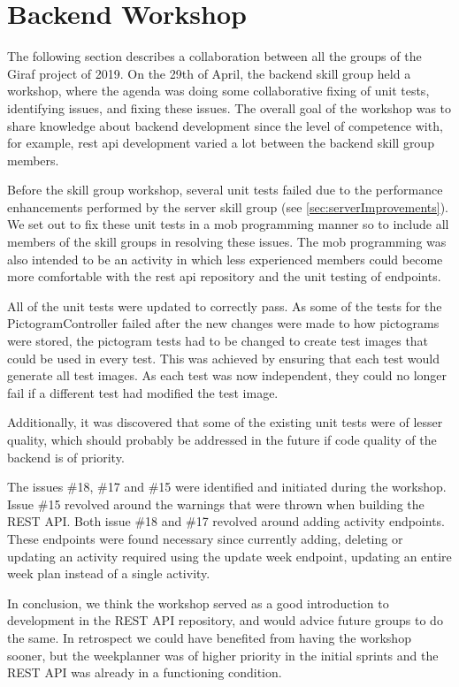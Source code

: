 \section{Backend Workshop}
The following section describes a collaboration between all the groups of the Giraf project of 2019. On the 29th of April, the backend skill group held a workshop, where the agenda was doing some collaborative fixing of unit tests, identifying issues, and fixing these issues. The overall goal of the workshop was to share knowledge about backend development since the level of competence with, for example, \gls{rest} \gls{api} development varied a lot between the backend skill group members.

Before the skill group workshop, several unit tests failed due to the performance enhancements performed by the server skill group (see \autoref{sec:serverImprovements}). We set out to fix these unit tests in a mob programming manner so to include all members of the skill groups in resolving these issues. The mob programming was also intended to be an activity in which less experienced members could become more comfortable with the \gls{rest} \gls{api} repository and the unit testing of endpoints.

All of the unit tests were updated to correctly pass. As some of the tests for the PictogramController failed after the new changes were made to how pictograms were stored, the pictogram tests had to be changed to create test images that could be used in every test. This was achieved by ensuring that each test would generate all test images. As each test was now independent, they could no longer fail if a different test had modified the test image.

Additionally, it was discovered that some of the existing unit tests were of lesser quality, which should probably be addressed in the future if code quality of the backend is of priority.

The issues \#18, \#17 and \#15 were identified and initiated during the workshop. Issue \#15 revolved around the warnings that were thrown when building the REST API. Both issue \#18 and \#17 revolved around adding activity endpoints. These endpoints were found necessary since currently adding, deleting or updating an activity required using the update week endpoint, updating an entire week plan instead of a single activity.

In conclusion, we think the workshop served as a good introduction to development in the REST API repository, and would advice future groups to do the same. In retrospect we could have benefited from having the workshop sooner, but the weekplanner was of higher priority in the initial sprints and the REST API was already in a functioning condition.